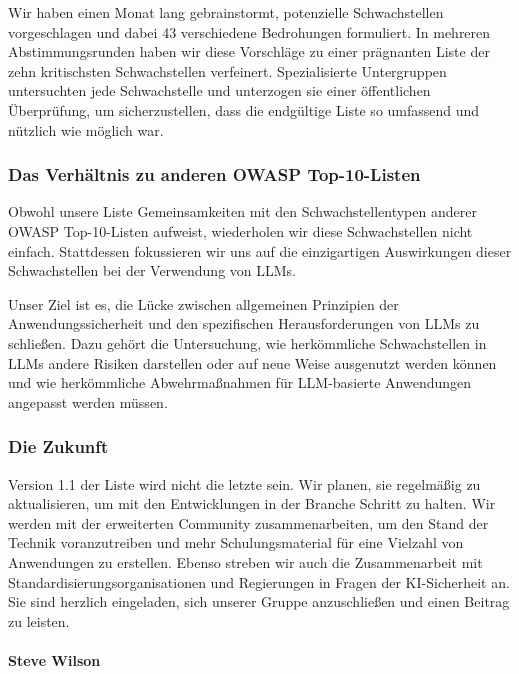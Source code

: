 \documentclass[
]{article}
\begin{document}
Wir haben einen Monat lang gebrainstormt, potenzielle Schwachstellen
vorgeschlagen und dabei 43 verschiedene Bedrohungen formuliert. In
mehreren Abstimmungsrunden haben wir diese Vorschläge zu einer
prägnanten Liste der zehn kritischsten Schwachstellen verfeinert.
Spezialisierte Untergruppen untersuchten jede Schwachstelle und
unterzogen sie einer öffentlichen Überprüfung, um sicherzustellen, dass
die endgültige Liste so umfassend und nützlich wie möglich war.

\subsubsection{Das Verhältnis zu anderen OWASP
Top-10-Listen}\label{das-verhuxe4ltnis-zu-anderen-owasp-top-10-listen}

Obwohl unsere Liste Gemeinsamkeiten mit den Schwachstellentypen anderer
OWASP Top-10-Listen aufweist, wiederholen wir diese Schwachstellen nicht
einfach. Stattdessen fokussieren wir uns auf die einzigartigen
Auswirkungen dieser Schwachstellen bei der Verwendung von LLMs.

Unser Ziel ist es, die Lücke zwischen allgemeinen Prinzipien der
Anwendungssicherheit und den spezifischen Herausforderungen von LLMs zu
schließen. Dazu gehört die Untersuchung, wie herkömmliche Schwachstellen
in LLMs andere Risiken darstellen oder auf neue Weise ausgenutzt werden
können und wie herkömmliche Abwehrmaßnahmen für LLM-basierte Anwendungen
angepasst werden müssen.

\subsubsection{Die Zukunft}\label{die-zukunft}

Version 1.1 der Liste wird nicht die letzte sein. Wir planen, sie
regelmäßig zu aktualisieren, um mit den Entwicklungen in der Branche
Schritt zu halten. Wir werden mit der erweiterten Community
zusammenarbeiten, um den Stand der Technik voranzutreiben und mehr
Schulungsmaterial für eine Vielzahl von Anwendungen zu erstellen. Ebenso
streben wir auch die Zusammenarbeit mit Standardisierungsorganisationen
und Regierungen in Fragen der KI-Sicherheit an. Sie sind herzlich
eingeladen, sich unserer Gruppe anzuschließen und einen Beitrag zu
leisten.

\paragraph{Steve Wilson}\label{steve-wilson}
\end{document}
